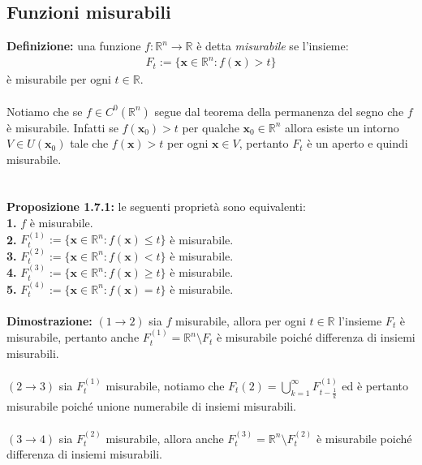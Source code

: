 \documentclass{article}
\numberwithin{equation}{subsection}
\begin{document}
\subsection{Funzioni misurabili}
\textbf{Definizione:} una funzione $f : \mathbb{R}^n \longrightarrow \mathbb{R}$ è detta \textit{misurabile} se l'insieme:
\begin{gather*}
    F_t := \{ \mathbf{x} \in \mathbb{R}^n : f(\mathbf{x}) > t \} 
\end{gather*}
è misurabile per ogni $t \in \mathbb{R}$. \\ \\
Notiamo che se $f \in C^0 (\mathbb{R}^n)$ segue dal teorema della permanenza del segno che $f$ è misurabile. Infatti se $f(\mathbf{x}_0) > t$ per qualche $\mathbf{x}_0 \in \mathbb{R}^n$ allora esiste un intorno $V \in U(\mathbf{x}_0)$ tale che $f(\mathbf{x}) > t$ per ogni $\mathbf{x} \in V$, pertanto $F_t$ è un aperto e quindi misurabile. \\ \\ \\
\textbf{Proposizione 1.7.1:} le seguenti proprietà sono equivalenti: \\
\textbf{1.} $f$ è misurabile. \\
\textbf{2.} $F_t^{(1)} := \{ \mathbf{x} \in \mathbb{R}^n : f(\mathbf{x}) \leq t \}$ è misurabile. \\
\textbf{3.} $F_t^{(2)} := \{ \mathbf{x} \in \mathbb{R}^n : f(\mathbf{x}) < t \}$ è misurabile. \\
\textbf{4.} $F_t^{(3)} := \{ \mathbf{x} \in \mathbb{R}^n : f(\mathbf{x}) \geq t \}$ è misurabile. \\
\textbf{5.} $F_t^{(4)} := \{ \mathbf{x} \in \mathbb{R}^n : f(\mathbf{x}) = t \}$ è misurabile. \\ \\
\textbf{Dimostrazione:} $(1 \rightarrow 2)$ sia $f$ misurabile, allora per ogni $t \in \mathbb{R}$ l'insieme $F_t$ è misurabile, pertanto anche $F_t^{(1)} = \mathbb{R}^n \setminus F_t$ è misurabile poiché differenza di insiemi misurabili. \\ \\
${(2 \rightarrow 3)}$ sia $F_t^{(1)}$ misurabile, notiamo che $F_t{(2)} = \bigcup_{k = 1}^\infty F_{t - \frac{1}{k}}^{(1)}$ ed è pertanto misurabile poiché unione numerabile di insiemi misurabili. \\ \\
${(3 \rightarrow 4)}$ sia $F_t^{(2)}$ misurabile, allora anche $F_t^{(3)} = \mathbb{R}^n \setminus F_t^{(2)}$ è misurabile poiché differenza di insiemi misurabili. \\ \\
\end{document}

